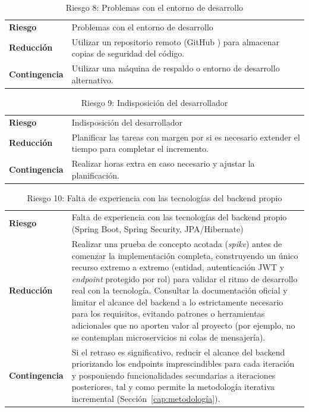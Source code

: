 \begin{table}[ht!]
\centering
\begin{tabular}{@{}p{3cm}p{10cm}@{}}
\textbf{Riesgo} & Problemas con el entorno de desarrollo \\[0.4em]
\textbf{Reducción} & Utilizar un repositorio remoto (GitHub \cite{github}) para almacenar copias de seguridad del código. \\[0.4em]
\textbf{Contingencia} & Utilizar una máquina de respaldo o entorno de desarrollo alternativo.
\end{tabular}
\caption{Riesgo 8: Problemas con el entorno de desarrollo}
\label{tab:riesgo8}
\end{table}

\begin{table}[ht!]
\centering
\begin{tabular}{@{}p{3cm}p{10cm}@{}}
\textbf{Riesgo} & Indisposición del desarrollador \\[0.4em]
\textbf{Reducción} & Planificar las tareas con margen por si es necesario extender el tiempo para completar el incremento. \\[0.4em]
\textbf{Contingencia} & Realizar horas extra en caso necesario y ajustar la planificación.
\end{tabular}
\caption{Riesgo 9: Indisposición del desarrollador}
\label{tab:riesgo9}
\end{table}

\begin{table}[ht!]
\centering
\begin{tabular}{@{}p{3cm}p{10cm}@{}}
\textbf{Riesgo} & Falta de experiencia con las tecnologías del backend propio (Spring Boot, Spring Security, JPA/Hibernate) \\[0.4em]
\textbf{Reducción} & Realizar una prueba de concepto acotada (\emph{spike}) antes de comenzar la implementación completa, construyendo un único recurso extremo a extremo (entidad, autenticación JWT y \emph{endpoint} protegido por rol) para validar el ritmo de desarrollo real con la tecnología. Consultar la documentación oficial y limitar el alcance del backend a lo estrictamente necesario para los requisitos, evitando patrones o herramientas adicionales que no aporten valor al proyecto (por ejemplo, no se contemplan microservicios ni colas de mensajería). \\[0.4em]
\textbf{Contingencia} & Si el retraso es significativo, reducir el alcance del backend priorizando los endpoints imprescindibles para cada iteración y posponiendo funcionalidades secundarias a iteraciones posteriores, tal y como permite la metodología iterativa incremental (Sección~\ref{cap:metodología}).
\end{tabular}
\caption{Riesgo 10: Falta de experiencia con las tecnologías del backend propio}
\label{tab:riesgo10}
\end{table}